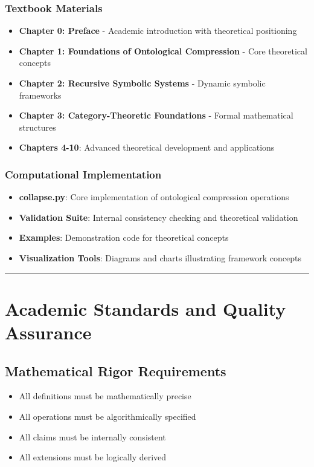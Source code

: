 \subsubsection{Textbook Materials}
\begin{itemize}
\item \textbf{Chapter 0: Preface} - Academic introduction with theoretical positioning
\item \textbf{Chapter 1: Foundations of Ontological Compression} - Core theoretical concepts
\item \textbf{Chapter 2: Recursive Symbolic Systems} - Dynamic symbolic frameworks
\item \textbf{Chapter 3: Category-Theoretic Foundations} - Formal mathematical structures
\item \textbf{Chapters 4-10}: Advanced theoretical development and applications
\end{itemize}

\subsubsection{Computational Implementation}
\begin{itemize}
\item \textbf{collapse.py}: Core implementation of ontological compression operations
\item \textbf{Validation Suite}: Internal consistency checking and theoretical validation
\item \textbf{Examples}: Demonstration code for theoretical concepts
\item \textbf{Visualization Tools}: Diagrams and charts illustrating framework concepts
\end{itemize}

\hrule

\section{Academic Standards and Quality Assurance}

\subsection{Mathematical Rigor Requirements}
\begin{itemize}
\item All definitions must be mathematically precise
\item All operations must be algorithmically specified
\item All claims must be internally consistent
\item All extensions must be logically derived
\end{itemize}

